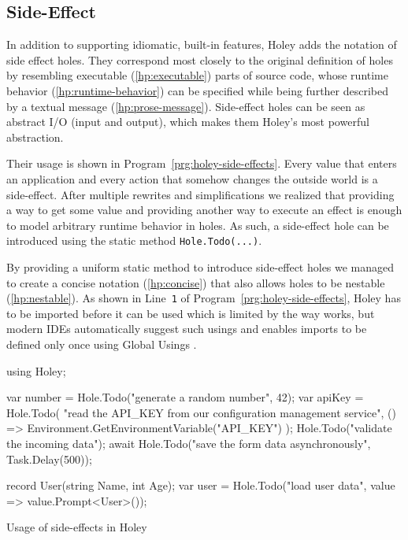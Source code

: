 \subsection{Side-Effect}
\label{sec:hole-type-side-effect}
In addition to supporting idiomatic, built-in \CS features, Holey adds the notation of side effect holes.
They correspond most closely to the original definition of holes by resembling executable (\ref{hp:executable}) parts of source code, whose runtime behavior (\ref{hp:runtime-behavior}) can be specified while being further described by a textual message (\ref{hp:prose-message}).
Side-effect holes can be seen as abstract I/O (input and output), which makes them Holey's most powerful abstraction.

Their usage is shown in Program~\ref{prg:holey-side-effects}.
Every value that enters an application and every action that somehow changes the outside world is a side-effect.
After multiple rewrites and simplifications we realized that providing a way to get some value and providing another way to execute an effect is enough to model arbitrary runtime behavior in holes.
As such, a side-effect hole can be introduced using the static method \verb|Hole.Todo(...)|.

By providing a uniform static method to introduce side-effect holes we managed to create a concise notation (\ref{hp:concise}) that also allows holes to be nestable (\ref{hp:nestable}).
As shown in Line~\verb|1| of Program~\ref{prg:holey-side-effects}, Holey has to be imported before it can be used which is limited by the way \CS works, but modern IDEs automatically suggest such usings and  enables imports to be defined only once using Global Usings \cite{koch_global_2021}.

\begin{program}[ht]
\begin{CsCode}
using Holey;

var number = Hole.Todo("generate a random number", 42);
var apiKey = Hole.Todo(
	"read the API_KEY from our configuration management service",
	() => Environment.GetEnvironmentVariable("API_KEY")
);
Hole.Todo("validate the incoming data");
await Hole.Todo("save the form data asynchronously", Task.Delay(500));

record User(string Name, int Age);
var user = Hole.Todo("load user data", value => value.Prompt<User>());
\end{CsCode}
\caption{Usage of side-effects in Holey}
\label{prg:holey-side-effects}
\end{program}

